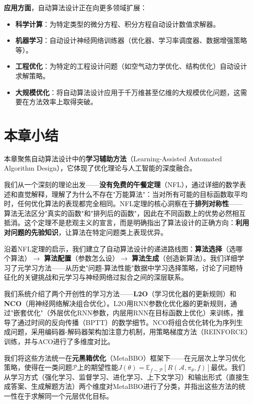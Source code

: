 \documentclass[lang=cn,zihao=-4,a4paper,fontset=windows]{beautybook}
\begin{document}
\textbf{应用方面}，自动算法设计正在向更多领域扩展：
\begin{itemize}
    \item \textbf{科学计算}：为特定类型的微分方程、积分方程自动设计数值求解器。
    \item \textbf{机器学习}：自动设计神经网络训练器（优化器、学习率调度器、数据增强策略等）。
    \item \textbf{工程优化}：为特定的工程设计问题（如空气动力学优化、结构优化）自动设计求解策略。
    \item \textbf{大规模优化}：将自动算法设计应用于千万维甚至亿维的大规模优化问题，这需要在方法效率上取得突破。
\end{itemize}

\section*{本章小结}

本章聚焦自动算法设计中的\textbf{学习辅助方法}（Learning-Assisted Automated Algorithm Design），它体现了优化理论与人工智能的深度融合。

我们从一个深刻的理论出发——\textbf{没有免费的午餐定理}（NFL），通过详细的数学表述和直觉解释，理解了为什么不存在"万能算法"：当对所有可能的目标函数取平均时，任何优化算法的表现都完全相同。NFL定理的核心洞察在于\textbf{排列对称性}——算法无法区分"真实的函数"和"排列后的函数"，因此在不同函数上的优势必然相互抵消。这个定理不是悲观主义的宣言，而是明确指出了算法设计的正确方向：\textbf{利用对问题的先验知识}，让算法在特定问题类上表现优异。

沿着NFL定理的启示，我们建立了自动算法设计的递进路线图：\textbf{算法选择}（选哪个算法）$\to$ \textbf{算法配置}（参数怎么设）$\to$ \textbf{算法生成}（创造新算法）。我们详细学习了元学习方法——从历史"问题-算法性能"数据中学习选择策略，讨论了问题特征化的关键挑战和元学习与神经网络过拟合之间的深层联系。

我们系统介绍了两个开创性的学习方法——\textbf{L2O}（学习优化器的更新规则）和\textbf{NCO}（用神经网络解决组合优化）。L2O用RNN参数化优化器的更新规则，通过"嵌套优化"（外层优化RNN参数，内层用RNN在目标函数上优化）来训练，推导了通过时间的反向传播（BPTT）的数学细节。NCO将组合优化转化为序列生成问题，采用编码器-解码器架构加注意力机制，用策略梯度方法（REINFORCE）训练，并与ACO进行了多维度对比。

我们将这些方法统一在\textbf{元黑箱优化}（MetaBBO）框架下——在元层次上学习优化策略，使得在一类问题$\mathcal{P}$上的期望性能$J(\theta) = \mathbb{E}_{f \sim \mathcal{P}}[R(\mathcal{A}, \pi_\theta, f)]$最优。我们从学习方式（强化学习、监督学习、进化学习、上下文学习）和输出形式（直接生成答案、生成解题方法）两个维度对MetaBBO进行了分类，并指出这些方法的统一性在于求解同一个元层优化目标。
\end{document}

